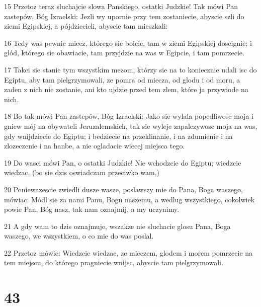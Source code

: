 \par 15 Przetoz teraz sluchajcie slowa Panskiego, ostatki Judzkie! Tak mówi Pan zastepów, Bóg Izraelski: Jezli wy upornie przy tem zostaniecie, abyscie szli do ziemi Egipskiej, a pójdziecieli, abyscie tam mieszkali:
\par 16 Tedy was pewnie miecz, którego sie boicie, tam w ziemi Egipskiej doscignie; i glód, którego sie obawiacie, tam przyjdzie na was w Egipcie, i tam pomrzecie.
\par 17 Takci sie stanie tym wszystkim mezom, którzy sie na to koniecznie udali isc do Egiptu, aby tam pielgrzymowali, ze pomra od miecza, od glodu i od moru, a zaden z nich nie zostanie, ani kto ujdzie przed tem zlem, które ja przywiode na nich.
\par 18 Bo tak mówi Pan zastepów, Bóg Izraelski: Jako sie wylala popedliwosc moja i gniew mój na obywateli Jeruzalemskich, tak sie wyleje zapalczywosc moja na was, gdy wnijdziecie do Egiptu; i bedziecie na przeklinanie, i na zdumienie i na zlozeczenie i na hanbe, a nie ogladacie wiecej miejsca tego.
\par 19 Do wasci mówi Pan, o ostatki Judzkie! Nie wchodzcie do Egiptu; wiedzcie wiedzac, (bo sie dzis oswiadczam przeciwko wam,)
\par 20 Poniewazescie zwiedli dusze wasze, poslawszy mie do Pana, Boga waszego, mówiac: Módl sie za nami Panu, Bogu naszemu, a wedlug wszystkiego, cokolwiek powie Pan, Bóg nasz, tak nam oznajmij, a my uczynimy.
\par 21 A gdy wam to dzis oznajmuje, wszakze nie sluchacie glosu Pana, Boga waszego, we wszystkiem, o co mie do was poslal.
\par 22 Przetoz mówie: Wiedzcie wiedzac, ze mieczem, glodem i morem pomrzecie na tem miejscu, do którego pragniecie wnijsc, abyscie tam pielgrzymowali.

\chapter{43}

